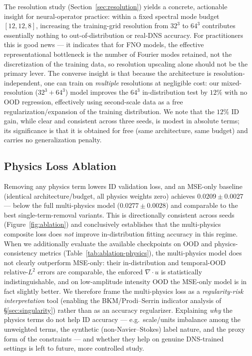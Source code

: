 \documentclass[review]{elsarticle}
\begin{document}
The resolution study (Section~\ref{sec:resolution}) yields a concrete, actionable insight for
neural-operator practice: within a fixed spectral mode budget $[12,12,8]$, increasing the
training-grid resolution from $32^3$ to $64^3$ contributes essentially nothing to
out-of-distribution or real-DNS accuracy. For practitioners this is good news --- it indicates
that for FNO models, the effective representational bottleneck is the number of Fourier modes
retained, not the discretization of the training data, so resolution upscaling alone should not
be the primary lever. The converse insight is that because the architecture is
resolution-independent, one can train on \emph{multiple} resolutions at negligible cost: our
mixed-resolution ($32^3{+}64^3$) model improves the $64^3$ in-distribution test by $12\%$ with
no OOD regression, effectively using second-scale data as a free regularization/expansion of the
training distribution. We note that the $12\%$ ID gain, while clear and consistent across three
seeds, is modest in absolute terms; its significance is that it is obtained for free (same
architecture, same budget) and carries no generalization penalty.

\subsection{Physics Loss Ablation}
\label{sec:physics-ablation-discussion}

Removing any physics term lowers ID validation loss, and an MSE-only baseline (identical architecture/budget, all physics weights zero) achieves $0.0209 \pm 0.0027$ --- below the full multi-physics model ($0.0277 \pm 0.0028$) and comparable to the best single-term-removal variants. This is directionally consistent across seeds (Figure~\ref{fig:ablation}) and conclusively establishes that the multi-physics composite loss does \emph{not} improve in-distribution fitting accuracy in this regime. When we additionally evaluate the available checkpoints on OOD and physics-consistency metrics (Table~\ref{tab:ablation-physics}), the multi-physics model does not clearly outperform MSE-only: their in-distribution and temporal-OOD relative-$L^2$ errors are comparable, the enforced $\nabla\cdot u$ is statistically indistinguishable, and on low-amplitude intensity OOD the MSE-only model is in fact slightly better. We therefore frame the multi-physics loss as a \emph{regularity-risk interpretation} tool (enabling the BKM/Prodi--Serrin indicator analysis of \S\ref{sec:singularity}) rather than as an accuracy regularizer. Explaining \emph{why} the physics terms do not help ID accuracy --- e.g.\ scale/units imbalance among the unweighted terms, the synthetic (non-Navier--Stokes) label nature, and the proxy form of the constraints --- and whether they help on genuine DNS-trained settings is left to future, more controlled study.
\end{document}
